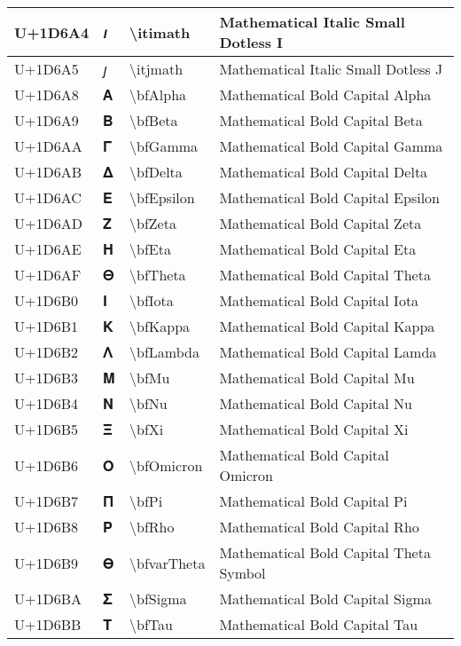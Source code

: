 \begin{table}[h]
\begin{tabulary}{\linewidth}{|L|L|L|L|}
\hline
U+1D6A4 & 𝚤 & {\textbackslash}itimath & Mathematical Italic Small Dotless I \\
\hline
U+1D6A5 & 𝚥 & {\textbackslash}itjmath & Mathematical Italic Small Dotless J \\
\hline
U+1D6A8 & 𝚨 & {\textbackslash}bfAlpha & Mathematical Bold Capital Alpha \\
\hline
U+1D6A9 & 𝚩 & {\textbackslash}bfBeta & Mathematical Bold Capital Beta \\
\hline
U+1D6AA & 𝚪 & {\textbackslash}bfGamma & Mathematical Bold Capital Gamma \\
\hline
U+1D6AB & 𝚫 & {\textbackslash}bfDelta & Mathematical Bold Capital Delta \\
\hline
U+1D6AC & 𝚬 & {\textbackslash}bfEpsilon & Mathematical Bold Capital Epsilon \\
\hline
U+1D6AD & 𝚭 & {\textbackslash}bfZeta & Mathematical Bold Capital Zeta \\
\hline
U+1D6AE & 𝚮 & {\textbackslash}bfEta & Mathematical Bold Capital Eta \\
\hline
U+1D6AF & 𝚯 & {\textbackslash}bfTheta & Mathematical Bold Capital Theta \\
\hline
U+1D6B0 & 𝚰 & {\textbackslash}bfIota & Mathematical Bold Capital Iota \\
\hline
U+1D6B1 & 𝚱 & {\textbackslash}bfKappa & Mathematical Bold Capital Kappa \\
\hline
U+1D6B2 & 𝚲 & {\textbackslash}bfLambda & Mathematical Bold Capital Lamda \\
\hline
U+1D6B3 & 𝚳 & {\textbackslash}bfMu & Mathematical Bold Capital Mu \\
\hline
U+1D6B4 & 𝚴 & {\textbackslash}bfNu & Mathematical Bold Capital Nu \\
\hline
U+1D6B5 & 𝚵 & {\textbackslash}bfXi & Mathematical Bold Capital Xi \\
\hline
U+1D6B6 & 𝚶 & {\textbackslash}bfOmicron & Mathematical Bold Capital Omicron \\
\hline
U+1D6B7 & 𝚷 & {\textbackslash}bfPi & Mathematical Bold Capital Pi \\
\hline
U+1D6B8 & 𝚸 & {\textbackslash}bfRho & Mathematical Bold Capital Rho \\
\hline
U+1D6B9 & 𝚹 & {\textbackslash}bfvarTheta & Mathematical Bold Capital Theta Symbol \\
\hline
U+1D6BA & 𝚺 & {\textbackslash}bfSigma & Mathematical Bold Capital Sigma \\
\hline
U+1D6BB & 𝚻 & {\textbackslash}bfTau & Mathematical Bold Capital Tau \\

\end{tabulary}
\end{table}
